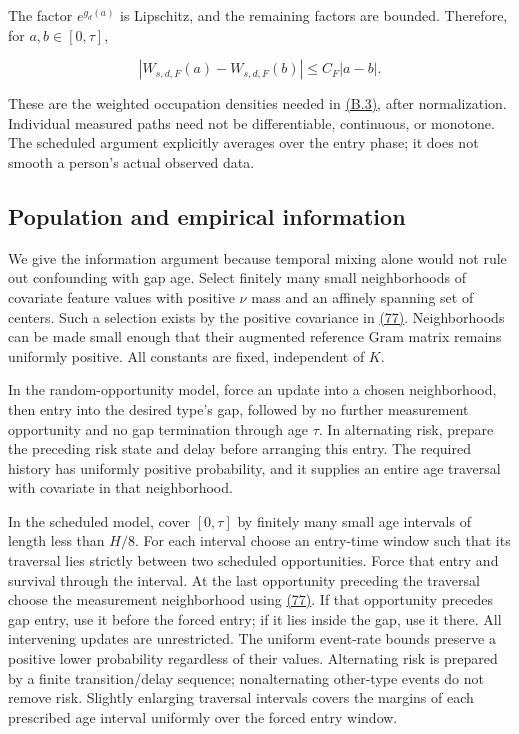 \documentclass[11pt]{article}
\begin{document}
The factor \(e^{g_d(a)}\) is Lipschitz, and the remaining factors are bounded. Therefore, for \(a,b\in[0,\tau]\),

\begin{equation*}
|W_{s,d,F}(a)-W_{s,d,F}(b)|\leq C_F|a-b|.
\tag{I.4}\label{eq:I.4}
\end{equation*}

These are the weighted occupation densities needed in \hyperref[eq:B.3]{(B.3)}, after normalization. Individual measured paths need not be differentiable, continuous, or monotone. The scheduled argument explicitly averages over the entry phase; it does not smooth a person's actual observed data.

\subsection{Population and empirical information}\label{sec:I.4}

We give the information argument because temporal mixing alone would not rule out confounding with gap age. Select finitely many small neighborhoods of covariate feature values with positive \(\nu\) mass and an affinely spanning set of centers. Such a selection exists by the positive covariance in \hyperref[eq:77]{(77)}. Neighborhoods can be made small enough that their augmented reference Gram matrix remains uniformly positive. All constants are fixed, independent of \(K\).

In the random-opportunity model, force an update into a chosen neighborhood, then entry into the desired type's gap, followed by no further measurement opportunity and no gap termination through age \(\tau\). In alternating risk, prepare the preceding risk state and delay before arranging this entry. The required history has uniformly positive probability, and it supplies an entire age traversal with covariate in that neighborhood.

In the scheduled model, cover \([0,\tau]\) by finitely many small age intervals of length less than \(H/8\). For each interval choose an entry-time window such that its traversal lies strictly between two scheduled opportunities. Force that entry and survival through the interval. At the last opportunity preceding the traversal choose the measurement neighborhood using \hyperref[eq:77]{(77)}. If that opportunity precedes gap entry, use it before the forced entry; if it lies inside the gap, use it there. All intervening updates are unrestricted. The uniform event-rate bounds preserve a positive lower probability regardless of their values. Alternating risk is prepared by a finite transition/delay sequence; nonalternating other-type events do not remove risk. Slightly enlarging traversal intervals covers the margins of each prescribed age interval uniformly over the forced entry window.
\end{document}
